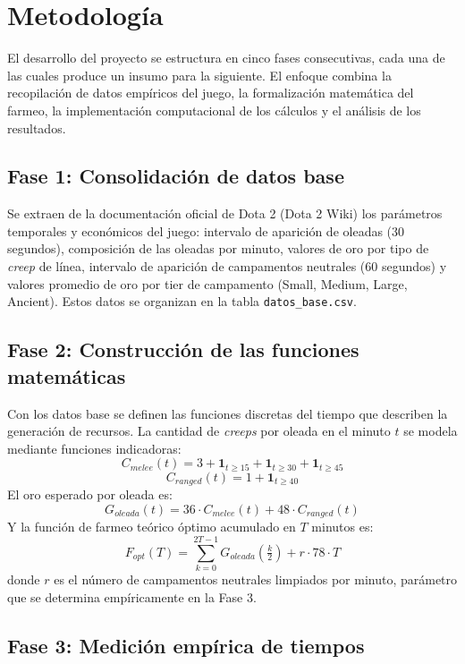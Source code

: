 \section{Metodología}

El desarrollo del proyecto se estructura en cinco fases consecutivas, cada una de las cuales produce un insumo para la siguiente. El enfoque combina la recopilación de datos empíricos del juego, la formalización matemática del farmeo, la implementación computacional de los cálculos y el análisis de los resultados.

\subsection{Fase 1: Consolidación de datos base}

Se extraen de la documentación oficial de Dota 2 (Dota 2 Wiki) los parámetros temporales y económicos del juego: intervalo de aparición de oleadas (30 segundos), composición de las oleadas por minuto, valores de oro por tipo de \textit{creep} de línea, intervalo de aparición de campamentos neutrales (60 segundos) y valores promedio de oro por tier de campamento (Small, Medium, Large, Ancient). Estos datos se organizan en la tabla \texttt{datos\_base.csv}.

\subsection{Fase 2: Construcción de las funciones matemáticas}

Con los datos base se definen las funciones discretas del tiempo que describen la generación de recursos. La cantidad de \textit{creeps} por oleada en el minuto \(t\) se modela mediante funciones indicadoras:
\[
C_{melee}(t) = 3 + \mathbf{1}_{t \geq 15} + \mathbf{1}_{t \geq 30} + \mathbf{1}_{t \geq 45}
\]
\[
C_{ranged}(t) = 1 + \mathbf{1}_{t \geq 40}
\]
El oro esperado por oleada es:
\[
G_{oleada}(t) = 36 \cdot C_{melee}(t) + 48 \cdot C_{ranged}(t)
\]
Y la función de farmeo teórico óptimo acumulado en \(T\) minutos es:
\[
F_{opt}(T) = \sum_{k=0}^{2T-1} G_{oleada}\!\left(\tfrac{k}{2}\right) + r \cdot 78 \cdot T
\]
donde \(r\) es el número de campamentos neutrales limpiados por minuto, parámetro que se determina empíricamente en la Fase 3.

\subsection{Fase 3: Medición empírica de tiempos}


